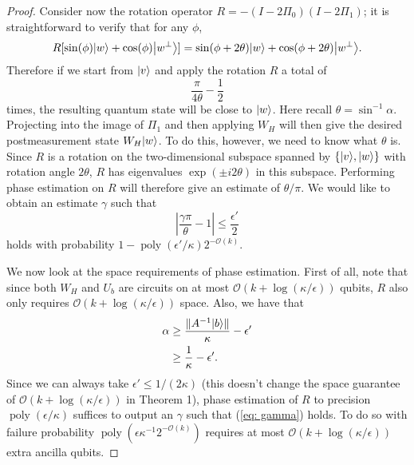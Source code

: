 \documentclass[11pt]{article}
\theoremstyle{definition}
\theoremstyle{remark}
\newcommand\bigoh{\mathcal{O}}
\DeclareMathOperator{\poly}{poly}
\begin{document}
\begin{proof}
Consider now the rotation operator $R=-(I-2\Pi_0)(I-2\Pi_1)$; it is straightforward to verify that for any $\phi$,
\begin{equation}
R[\sin(\phi) {\left\vert{w}\right\rangle} + \cos(\phi) {\left\vert{w^\perp}\right\rangle}] = \sin(\phi + 2\theta) {\left\vert{w}\right\rangle} + \cos(\phi + 2\theta) {\left\vert{w^\perp}\right\rangle}.
\end{equation}
Therefore if we start from ${\left\vert{v}\right\rangle}$ and apply the rotation $R$ a total of
\begin{equation}
\frac{\pi}{4\theta} - \frac{1}{2}
\end{equation}
times, the resulting quantum state will be close to ${\left\vert{w}\right\rangle}$. Here recall $\theta = \sin^{-1}\alpha$. Projecting into the image of $\Pi_1$ and then applying $W_H$ will then give the desired postmeasurement state $W_H{\left\vert{w}\right\rangle}$. To do this, however, we need to know what $\theta$ is. Since $R$ is a rotation on the two-dimensional subspace spanned by $\{{\left\vert{v}\right\rangle},{\left\vert{w}\right\rangle}\}$ with rotation angle $2\theta$, $R$ has eigenvalues $\exp(\pm i2\theta)$ in this subspace. Performing phase estimation on $R$ will therefore give an estimate of $\theta/\pi$. We would like to obtain an estimate $\gamma$ such that 
\begin{equation} \label{eq: gamma}
\left|\frac{\gamma\pi}{\theta} - 1\right| \le  \frac{\epsilon'}{2}
\end{equation}
holds with probability $1-\poly(\epsilon' / \kappa)2^{-\mathcal{O}(k)}$.

We now look at the space requirements of phase estimation. First of all, note that since both $W_H$ and $U_b$ are circuits on at most $\bigoh (k + \log(\kappa/\epsilon))$ qubits, $R$ also only requires $\bigoh (k + \log(\kappa/\epsilon))$ space. Also, we have that
\begin{align}
\alpha &\ge \frac{\|A^{-1}{\left\vert{b}\right\rangle}\|}{\kappa} - \epsilon' \\
&\ge \frac{1}{\kappa} - \epsilon'.
\end{align}
Since we can always take $\epsilon' \le 1/(2\kappa)$ (this doesn't change the space guarantee of $\bigoh (k+\log(\kappa/\epsilon))$ in Theorem 1), phase estimation of $R$ to precision $\poly(\epsilon/\kappa)$ suffices to output an $\gamma$ such that (\ref{eq: gamma}) holds. To do so with failure probability $\poly(\epsilon \kappa^{-1}2^{-\mathcal{O}(k)})$ requires at most $\bigoh(k+\log(\kappa/\epsilon))$ extra ancilla qubits.


\end{proof}
\end{document}
